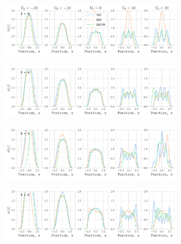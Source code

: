 \begin{figure}[H]
    \centering
    \begin{subfigure}[b]{0.8\textwidth}
        \centering
        \includegraphics[width=\textwidth]{Chapters/Results/N2/density_profile_N[3]_nqs_DSFFN.pdf}
        \label{fig:total_n2}
        \vspace{-1.25cm}
    \end{subfigure}
    \begin{subfigure}[b]{0.8\textwidth}
        \centering
        \includegraphics[width=\textwidth]{Chapters/Results/N2/density_profile_N[4]_nqs_DSFFN.pdf}
        \label{fig:total_n4}
        \vspace{-1.25cm}
    \end{subfigure}
    \begin{subfigure}[b]{0.8\textwidth}
        \centering
        \includegraphics[width=\textwidth]{Chapters/Results/N2/density_profile_N[5]_nqs_DSFFN.pdf}
        \label{fig:total_n6}
        \vspace{-1.25cm}
    \end{subfigure}
    \begin{subfigure}[b]{0.8\textwidth}
    \centering
    \includegraphics[width=\textwidth]{Chapters/Results/N2/density_profile_N[6]_nqs_DSFFN.pdf}

\end{subfigure}
\end{figure}

